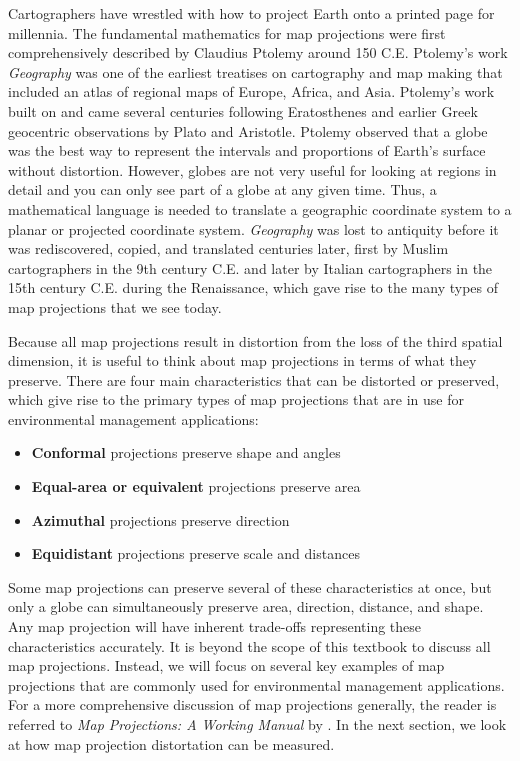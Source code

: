 \documentclass[
]{book}
\providecommand{\tightlist}{%
  \setlength{\itemsep}{0pt}\setlength{\parskip}{0pt}}
\begin{document}
Cartographers have wrestled with how to project Earth onto a printed page for millennia. The fundamental mathematics for map projections were first comprehensively described by Claudius Ptolemy around 150 C.E. Ptolemy's work \emph{Geography} was one of the earliest treatises on cartography and map making that included an atlas of regional maps of Europe, Africa, and Asia. Ptolemy's work built on and came several centuries following Eratosthenes and earlier Greek geocentric observations by Plato and Aristotle. Ptolemy observed that a globe was the best way to represent the intervals and proportions of Earth's surface without distortion. However, globes are not very useful for looking at regions in detail and you can only see part of a globe at any given time. Thus, a mathematical language is needed to translate a geographic coordinate system to a planar or projected coordinate system. \emph{Geography} was lost to antiquity before it was rediscovered, copied, and translated centuries later, first by Muslim cartographers in the 9th century C.E. and later by Italian cartographers in the 15th century C.E. during the Renaissance, which gave rise to the many types of map projections that we see today.

Because all map projections result in distortion from the loss of the third spatial dimension, it is useful to think about map projections in terms of what they preserve. There are four main characteristics that can be distorted or preserved, which give rise to the primary types of map projections that are in use for environmental management applications:

\begin{itemize}
\tightlist
\item
  \textbf{Conformal} projections preserve shape and angles
\item
  \textbf{Equal-area or equivalent} projections preserve area
\item
  \textbf{Azimuthal} projections preserve direction
\item
  \textbf{Equidistant} projections preserve scale and distances
\end{itemize}

Some map projections can preserve several of these characteristics at once, but only a globe can simultaneously preserve area, direction, distance, and shape. Any map projection will have inherent trade-offs representing these characteristics accurately. It is beyond the scope of this textbook to discuss all map projections. Instead, we will focus on several key examples of map projections that are commonly used for environmental management applications. For a more comprehensive discussion of map projections generally, the reader is referred to \emph{Map Projections: A Working Manual} by \citep{snyder1987map}. In the next section, we look at how map projection distortation can be measured.
\end{document}
